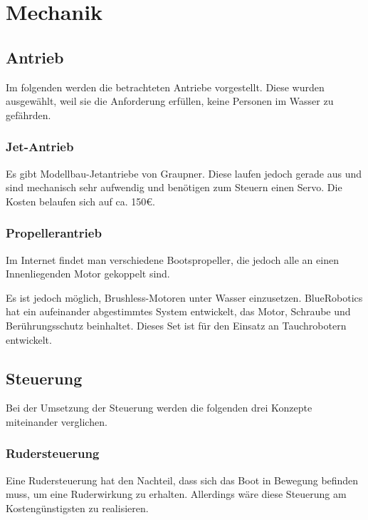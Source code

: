 \documentclass[a4paper]{article}
\begin{document}
\section{Mechanik}

\subsection{Antrieb}

Im folgenden werden die betrachteten Antriebe vorgestellt. Diese wurden ausgewählt, weil sie die 
Anforderung erfüllen, keine Personen im Wasser zu gefährden.

\subsubsection{Jet-Antrieb}

Es gibt Modellbau-Jetantriebe von Graupner. Diese laufen jedoch gerade aus und sind mechanisch 
sehr aufwendig und benötigen zum Steuern einen Servo. Die Kosten belaufen sich auf ca. 150\euro.

\subsubsection{Propellerantrieb}

Im Internet findet man verschiedene Bootspropeller, die jedoch alle an einen Innenliegenden Motor 
gekoppelt sind.

Es ist jedoch möglich, Brushless-Motoren unter Wasser einzusetzen. BlueRobotics hat ein 
aufeinander abgestimmtes System entwickelt, das Motor, Schraube und Berührungsschutz beinhaltet. 
Dieses Set ist für den Einsatz an Tauchrobotern entwickelt.

\subsection{Steuerung}

Bei der Umsetzung der Steuerung werden die folgenden drei Konzepte miteinander verglichen.

\subsubsection{Rudersteuerung}

Eine Rudersteuerung hat den Nachteil, dass sich das Boot in Bewegung befinden muss, um eine 
Ruderwirkung zu erhalten. Allerdings wäre diese Steuerung am Kostengünstigsten zu realisieren.
\end{document}
